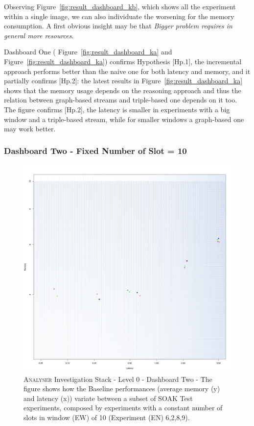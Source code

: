 Observing Figure~\ref{fig:result_dashboard_kb}, which shows all the experiment within a single image, we can also individuate the worsening for the memory consumption. A first obvious insight may be that \textit{Bigger problem requires in general more resources}. %

Dashboard One ( Figure~\ref{fig:result_dashboard_ka} and Figure~\ref{fig:result_dashboard_ka}) confirms Hypothesis [Hp.1], the incremental approach performs better than the naive one for both latency and memory, and it partially confirms  [Hp.2]: the latest results in Figure~\ref{fig:result_dashboard_ka} shows that the memory usage depends on the reasoning approach and thus the relation between graph-based streams and triple-based one depends on it too. The figure confirms [Hp.2], the latency is smaller in experiments with a big window and a triple-based stream, while for smaller windows a graph-based one may work better.


\subsubsection{Dashboard Two - Fixed Number of Slot = 10}


\begin{figure}[h!tbp]
	\centering
	\includegraphics[width=0.85\linewidth]{images/dashboard-2}	
	\caption[\textsc{Analyser} Investigation Stack - Level 0 - Dashboard Two - Multiplot Version]{\textsc{Analyser} Investigation Stack - Level 0 - Dashboard Two - The figure shows how the Baseline performances (average memory (y) and latency (x)) variate between a subset of SOAK Test experiments, composed by experiments with a constant number of slots in window (EW) of 10 (Experiment (EN) 6,2,8,9).} 	%
	
	\label{fig:result_dashboard_ewb}
\end{figure}

